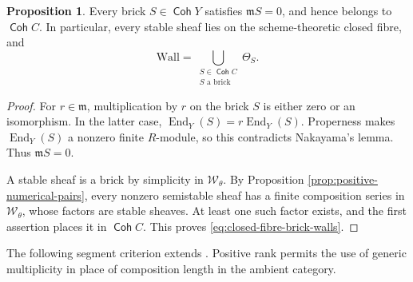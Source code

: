 \documentclass[a4paper,reqno]{amsart}
\def\S{\mathcal{S}}
\def\W{\mathcal{W}}
\def\m{\mathfrak{m}}
\DeclareMathOperator{\Coh}{\mathsf{Coh}}
\DeclareMathOperator{\End}{End}
\theoremstyle{definition}
\newtheorem{Prop}[Thm]{Proposition}
\begin{document}
\begin{Prop}\label{prop:closed-fibre-walls}
Every brick $S\in\Coh Y$ satisfies $\m S=0$, and hence belongs to $\Coh C$. In particular, every stable sheaf lies on the scheme-theoretic closed fibre, and
\begin{equation}\label{eq:closed-fibre-brick-walls}
\mathrm{Wall}
=\bigcup_{\substack{S\in\Coh C\\S\text{ a brick}}}\Theta_S.
\end{equation}
\end{Prop}
\begin{proof}
For $r\in\m$, multiplication by $r$ on the brick $S$ is either zero or an isomorphism. In the latter case, $\End_Y(S)=r\End_Y(S)$. Properness makes $\End_Y(S)$ a nonzero finite $R$-module, so this contradicts Nakayama's lemma. Thus $\m S=0$.

A stable sheaf is a brick by simplicity in $\W_\theta$. By Proposition \ref{prop:positive-numerical-pairs}, every nonzero semistable sheaf has a finite composition series in $\W_\theta$, whose factors are stable sheaves. At least one such factor exists, and the first assertion places it in $\Coh C$. This proves \eqref{eq:closed-fibre-brick-walls}.
\end{proof}

The following segment criterion extends \cite[Theorem 2.16]{Asa21}. Positive rank permits the use of generic multiplicity in place of composition length in the ambient category.
\end{document}
